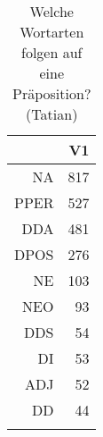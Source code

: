 \begin{table}[ht]
\centering
\begin{tabular}{rr}
  \lsptoprule
 & V1 \\ 
  \midrule
NA & 817 \\ 
  PPER & 527 \\ 
  DDA & 481 \\ 
  DPOS & 276 \\ 
  NE & 103 \\ 
  NEO &  93 \\ 
  DDS &  54 \\ 
  DI &  53 \\ 
  ADJ &  52 \\ 
  DD &  44 \\ 
   \lspbottomrule
\end{tabular}
\caption{Welche Wortarten folgen auf eine Präposition?  (Tatian)} 
\end{table}
